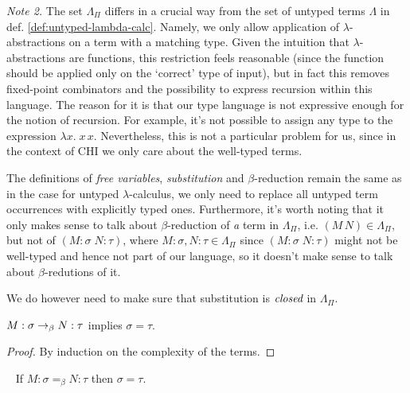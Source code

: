 \emph{Note 2.}
    The set $\Lambda_\Pi$ differs in a crucial way from the set of
    untyped terms $\Lambda$ in def.  \ref{def:untyped-lambda-calc}.
    Namely, we only allow application of $\lambda$-abstractions on a
    term with a matching type.  Given the intuition that
    $\lambda$-abstractions are functions, this restriction feels
    reasonable (since the function should be applied only on the
    `correct' type of input), but in fact this removes fixed-point
    combinators and the possibility to express recursion within this
    language. The reason for it is that our type language is not
    expressive enough for the notion of recursion. For example, it's
    not possible to assign any type to the expression $\lambda x.\; x\,
    x$. Nevertheless, this is not a particular problem for us, since in
    the context of CHI we only care about the well-typed terms.

The definitions of \emph{free variables}, \emph{substitution} and
$\beta$-reduction remain the same as in the case for untyped
$\lambda$-calculus, we only need to replace all untyped term occurrences with
explicitly typed ones. Furthermore, it's worth noting that it only makes sense
to talk about $\beta$-reduction of \emph{a} term in $\Lambda_\Pi$, i.e. $(M\,
N) \in \Lambda_\Pi$, but not of $(M\!:\!\sigma\; N\!:\!\tau)$, where $M:\sigma, N:\tau
\in \Lambda_\Pi$ since $(M\!:\!\sigma\; N\!:\!\tau)$ might not be well-typed and
hence not part of our language, so it doesn't make sense to talk about
$\beta$-redutions of it.

We do however need to make sure that substitution is $\emph{closed}$ in
$\Lambda_\Pi$.

\begin{proposition}
    $M:\sigma \rightarrow_\beta N:\tau$ implies $\sigma = \tau$.
\end{proposition}
\begin{proof}
    By induction on the complexity of the terms.
\end{proof}

\begin{corollary} {\ }
    If $M:\sigma =_\beta N:\tau$ then $\sigma = \tau$.
\end{corollary}

